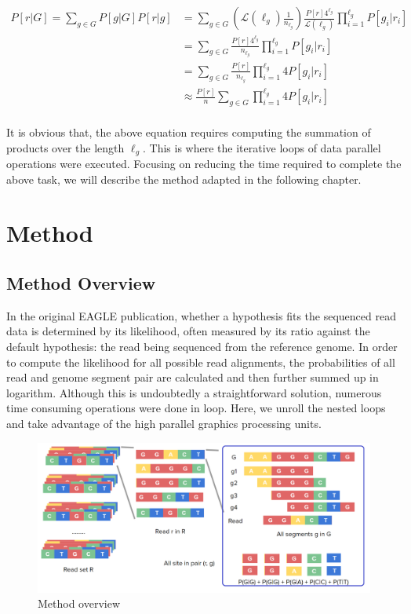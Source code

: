 \documentclass{PHlab-thesis}
\begin{document}
\begin{equation*}
\begin{split}
P[r|G] =  \sum_{g\in G} P[g|G] P[r|g] &= \sum_{g\in G} \left( \mathcal{L}(\ell_g) \frac{1}{n_{\ell_g}} \right) \frac{P[r]4^{\ell_g}}{\mathcal{L}(\ell_g)} \prod_{i=1}^{\ell_g} P[g_i|r_i]  \\
                                      &= \sum_{g\in G} \frac{P[r]4^{\ell_g}}{n_{\ell_g}} \prod_{i=1}^{\ell_g} P[g_i|r_i]  \\
                                      &= \sum_{g\in G} \frac{P[r]}{n_{\ell_g}} \prod_{i=1}^{\ell_g} 4P[g_i|r_i]  \\
                                      &\approx \frac{P[r]}{n} \sum_{g\in G} \prod_{i=1}^{\ell_g} 4P[g_i|r_i]  \\
\end{split}
\end{equation*}

It is obvious that, the above equation requires computing the summation of products over the length $\ell_g$. This is where the iterative loops of data parallel operations were executed. Focusing on reducing the time required to complete the above task, we will describe the method adapted in the following chapter.

\chapter{Method}
\section{Method Overview}
In the original EAGLE publication, whether a hypothesis fits the sequenced read data is determined by its likelihood, often measured by its ratio against the default hypothesis: the read being sequenced from the reference genome. In order to compute the likelihood for all possible read alignments, the probabilities of all read and genome segment pair are calculated and then further summed up in logarithm. Although this is undoubtedly a straightforward solution, numerous time consuming operations were done in loop. Here, we unroll the nested loops and take advantage of the high parallel graphics processing units. 


\begin{figure}
	\centering
	\includegraphics[scale=0.3]{figures/overview.png}
	\caption{Method overview}
	\label{fig:overview} %
\end{figure}
\end{document}
